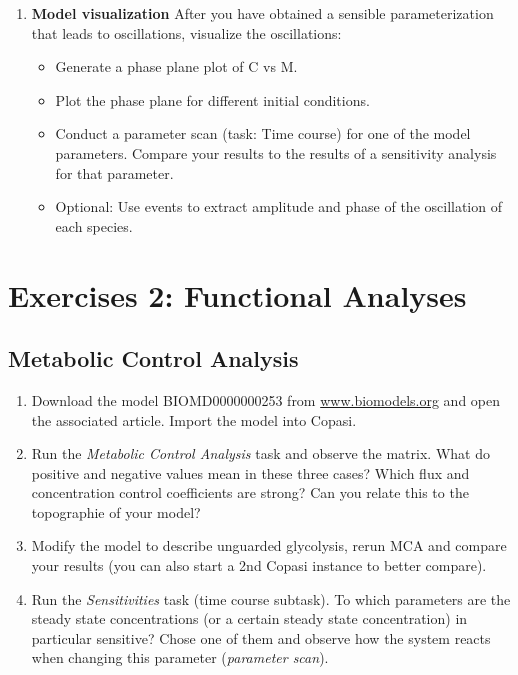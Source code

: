 \documentclass[a4paper,11pt,twoside]{article}
\begin{document}
\begin{enumerate}
\item \textbf{Model visualization}
After you have obtained a sensible parameterization that leads to oscillations, visualize the oscillations:
\begin{itemize}
 \item Generate a phase plane plot of C vs M.
 \item Plot the phase plane for different initial conditions.
 \item Conduct a parameter scan (task: Time course) for one of the model parameters. Compare your results to the results of a sensitivity analysis for that parameter.
 \item Optional: Use events to extract amplitude and phase of the oscillation of each species.
\end{itemize}
\end{enumerate}


\newpage
\section{Exercises 2: Functional Analyses}

\subsection{Metabolic Control Analysis} 
 \begin{enumerate}
 \item Download the model BIOMD0000000253 from \url{www.biomodels.org} and open the associated article. Import the model into Copasi.
 \item Run the \textit{Metabolic Control Analysis} task and observe the matrix. What do positive and negative values mean in these three cases? Which flux and concentration control coefficients are strong? Can you relate this to the topographie of your model?
 \item Modify the model to describe unguarded glycolysis, rerun MCA and compare your results (you can also start a 2nd Copasi instance to better compare).
 \item Run the \textit{Sensitivities} task (time course subtask). To which parameters are the steady state concentrations (or a certain steady state concentration) in particular sensitive? Chose one of them and observe how the system reacts when changing this parameter (\textit{parameter scan}).
 \end{enumerate}
 
\end{document}
